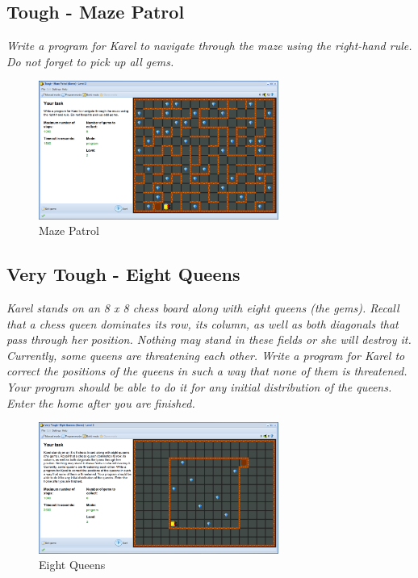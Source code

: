 \documentclass[article,A4,12pt]{llncs}
\begin{document}
\newpage

\subsection{Tough - Maze Patrol}

{\em Write a program for Karel to navigate through the maze using the 
right-hand rule. Do not forget to pick up all gems.}

\begin{figure}[!ht]
\begin{center}
\includegraphics[width=0.7\textwidth]{img/game-patrol.png}
\end{center}
\vspace{-4mm}
\caption{Maze Patrol}
\label{fig:patrol}
\vspace{-10mm}
\end{figure}
\noindent

\newpage
\subsection{Very Tough - Eight Queens}

{\em Karel stands on an 8 x 8 chess board along with eight queens (the gems). Recall that a chess queen dominates its row, its column, as well as both diagonals that pass through her position. Nothing may stand in these fields or she will destroy it. Currently, some queens are threatening each other. Write a program for Karel to correct the positions of the queens in such a way that none of them is threatened. Your program should be able to do it for any initial distribution of the queens. Enter the home after you are finished.}

\begin{figure}[!ht]
\begin{center}
\includegraphics[width=0.7\textwidth]{img/game-queens.png}
\end{center}
\vspace{-4mm}
\caption{Eight Queens}
\label{fig:queens}
\vspace{-10mm}
\end{figure}
\noindent
\end{document}
